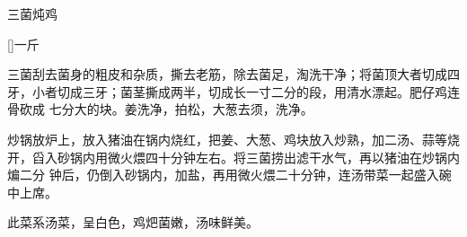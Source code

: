 \begin{recipe}{三菌炖鸡}

\ingredients

[\footnotemark]{一斤}

\preparation

\step 三菌刮去菌身的粗皮和杂质，撕去老筋，除去菌足，淘洗干净；将菌顶大者切成四
牙，小者切成三牙；菌茎撕成两半，切成长一寸二分的段，用清水漂起。肥仔鸡连骨砍成
七分大的块。姜洗净，拍松，大葱去须，洗净。

\step 炒锅放炉上，放入猪油在锅内烧红，把姜、大葱、鸡块放入炒熟，加二汤、蒜等烧
开，舀入砂锅内用微火煨四十分钟左右。将三菌捞出滤干水气，再以猪油在炒锅内煸二分
钟后，仍倒入砂锅内，加盐，再用微火煨二十分钟，连汤带菜一起盛入碗中上席。

\features

此菜系汤菜，呈白色，鸡𤆵菌嫩，汤味鲜美。


\end{recipe}

